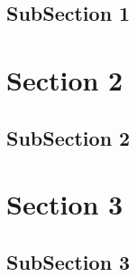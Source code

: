 \subsection{SubSection 1}
\Blindtext

\section{Section 2}
\Blindtext

\subsection{SubSection 2}
\Blindtext

\section{Section 3}
\Blindtext

\subsection{SubSection 3}
\Blindtext